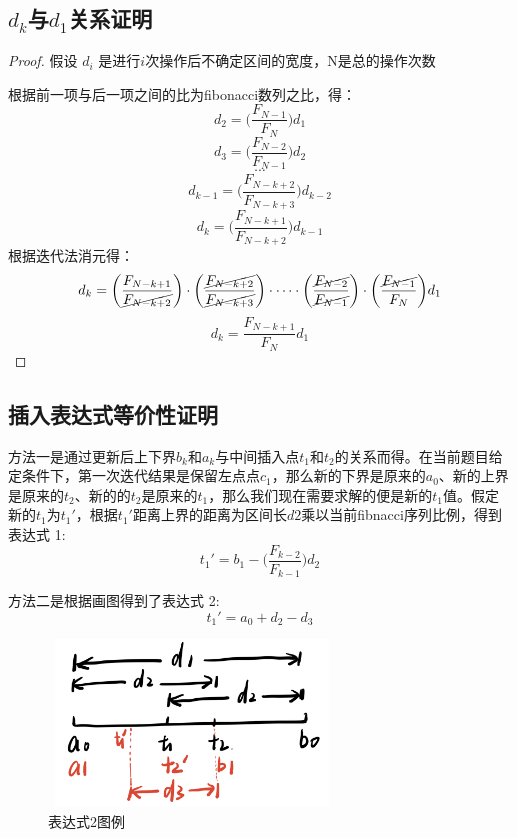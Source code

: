 \documentclass[a4paper, 12pt]{ctexart}  %
\begin{document}
\subsection{$d_{k}$与$d_{1}$关系证明}
\begin{proof}
假设 $d_{i}$  是进行$i$次操作后不确定区间的宽度，N是总的操作次数

根据前一项与后一项之间的比为fibonacci数列之比，得：
\[ d_{2}  =  \bigg(\frac{F_{N-1}}{F_{N}}\bigg)d_{1} \]
\[ d_{3}  =   \bigg(\frac{F_{N-2}}{F_{N-1}}\bigg)d_{2} \]
\[  \cdots \]
\[ d_{k-1}  =   \bigg(\frac{F_{N-k+2}}{F_{N-k+3}}\bigg)d_{k-2} \]
\[ d_{k}  =   \bigg(\frac{F_{N-k+1}}{F_{N-k+2}}\bigg)d_{k-1} \]
根据迭代法消元得：
\[ d_{k} =  \bigg(\frac{F_{N-k+1}}{\cancel{F_{N-k+2}}}\bigg) \cdot \bigg(\frac{\cancel{F_{N-k+2}}}{\cancel{F_{N-k+3}}}\bigg) \cdot \dots  \cdot \bigg(\frac{\cancel{F_{N-2}}}{\cancel{F_{N-1}}}\bigg) \cdot \bigg(\frac{\cancel{F_{N-1}}}{F_{N}}\bigg) d_{1} \]
\[ d_{k}=\frac{F_{N-k+1}}{F_{N}}d_{1} \]
\end{proof}

\subsection{插入表达式等价性证明}
方法一是通过更新后上下界$b_{k}$和$a_{k}$与中间插入点$t_{1}$和$t_{2}$的关系而得。在当前题目给定条件下，第一次迭代结果是保留左点点$c_{1}$，那么新的下界是原来的$a_{0}$、新的上界是原来的$t_{2}$、新的的$t_{2}$是原来的$t_{1}$，那么我们现在需要求解的便是新的$t_{1}$值。假定新的$t_{1}$为$t_{1}'$，根据$t_{1}'$距离上界的距离为区间长$d2$乘以当前fibnacci序列比例，得到表达式 1: \begin{equation} t_{1}' = b_{1} - \bigg( \frac{F_{k-2}}{F_{k-1}}  \bigg) d_{2}  \end{equation}

方法二是根据画图得到了表达式 2: 
\begin{equation}
t_{1}' = a_{0} + d_{2} - d_{3}
\end{equation}
\begin{figure}[h]
\centering
\includegraphics[height=1.75in, width=3in]{fibnacci.jpg}
\caption{表达式2图例}
\end{figure}
\end{document}
